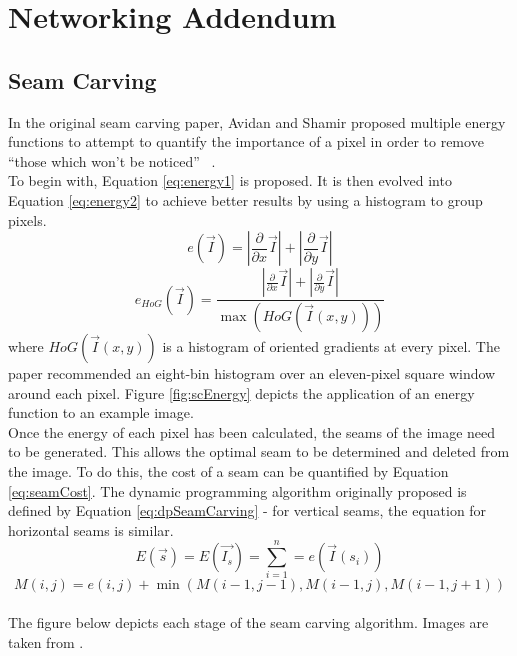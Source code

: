 \chapter{Networking Addendum}

\section{Seam Carving}
\label{app:seamCarving}

\indent \indent
In the original seam carving paper, Avidan and Shamir proposed multiple energy functions to attempt to quantify the importance of a pixel in order to remove ``those which won't be noticed'' ~\cite{SeamCarving}.
\smallskip \\ \indent
To begin with, Equation \ref{eq:energy1} is proposed. It is then evolved into Equation \ref{eq:energy2} to achieve better results by using a histogram to group pixels.
\begin{equation}
    \label{eq:energy1}
    e(\vec{I}) = \left| \frac{\partial}{\partial x} \vec{I} \right| + \left| \frac{\partial}{\partial y} \vec{I} \right|
\end{equation}
\begin{equation}
    \label{eq:energy2}
    e_{\textit{HoG}}(\vec{I}) = \frac{\left| \frac{\partial}{\partial x} \vec{I} \right| + \left| \frac{\partial}{\partial y} \vec{I} \right|}{\max{(\textit{HoG}(\vec{I}(x,y)))}}
\end{equation}
where $\textit{HoG}(\vec{I}(x,y))$ is a histogram of oriented gradients at every pixel. The paper recommended an eight-bin histogram over an eleven-pixel square window around each pixel. Figure \ref{fig:scEnergy} depicts the application of an energy function to an example image.
\smallskip \\ \indent
Once the energy of each pixel has been calculated, the seams of the image need to be generated. This allows the optimal seam to be determined and deleted from the image. To do this, the cost of a seam can be quantified by Equation \ref{eq:seamCost}. The dynamic programming algorithm originally proposed is defined by Equation \ref{eq:dpSeamCarving} - for vertical seams, the equation for horizontal seams is similar.
\begin{equation}
    \label{eq:seamCost}
    E(\vec{s}) = E(\vec{I_s}) = \sum^n_{i=1} = e(\vec{I}(s_i))
\end{equation}
\begin{equation}
    \label{eq:dpSeamCarving}
    M(i, j) = e(i,j) + \min{(M(i-1, j-1), M(i-1, j), M(i-1, j+1))}
\end{equation}
\bigskip \\ \indent
The figure below depicts each stage of the seam carving algorithm. Images are taken from \cite{wikiSeamCarving}.


